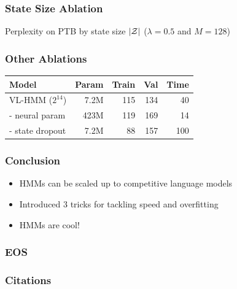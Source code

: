 \documentclass{beamer}
\begin{document}
\begin{frame}
\frametitle{State Size Ablation}

\centering
{}

Perplexity on PTB by state size $|\mathcal{Z}|$ ($\lambda =0.5$ and $M=128$)
\end{frame}

\begin{frame}
\frametitle{Other Ablations}

\begin{center}
\begin{tabular}{lrrrr}
\toprule
Model                & Param & Train  & Val  &  Time \\
\midrule
VL-HMM ($2^{14}$)    & 7.2M & 115    & 134  & 40\\
\quad - neural param & 423M & 119    & 169  & 14\\
\quad - state dropout      & 7.2M & 88     & 157  & 100\\
\bottomrule
\end{tabular}
\end{center}
\end{frame}


\begin{frame}
\frametitle{Conclusion}
\begin{itemize}
\item HMMs can be scaled up to competitive language models
\item Introduced 3 tricks for tackling speed and overfitting
\item HMMs are cool!
\end{itemize}
\end{frame}

\begin{frame}
\frametitle{EOS}
\end{frame}


\begin{frame}
\frametitle{Citations}


\end{frame}
\end{document}
